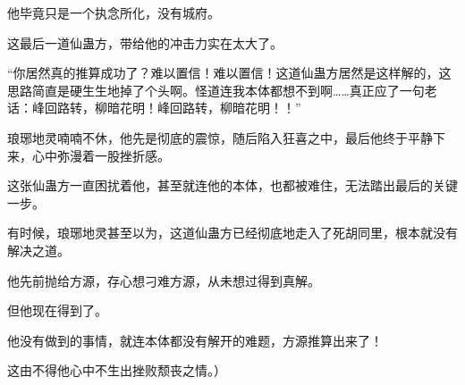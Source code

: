 \begin{this_body}
他毕竟只是一个执念所化，没有城府。

这最后一道仙蛊方，带给他的冲击力实在太大了。

“你居然真的推算成功了？难以置信！难以置信！这道仙蛊方居然是这样解的，这思路简直是硬生生地掉了个头啊。怪道连我本体都想不到啊……真正应了一句老话：峰回路转，柳暗花明！峰回路转，柳暗花明！！”

琅琊地灵喃喃不休，他先是彻底的震惊，随后陷入狂喜之中，最后他终于平静下来，心中弥漫着一股挫折感。

这张仙蛊方一直困扰着他，甚至就连他的本体，也都被难住，无法踏出最后的关键一步。

有时候，琅琊地灵甚至以为，这道仙蛊方已经彻底地走入了死胡同里，根本就没有解决之道。

他先前抛给方源，存心想刁难方源，从未想过得到真解。

但他现在得到了。

他没有做到的事情，就连本体都没有解开的难题，方源推算出来了！

这由不得他心中不生出挫败颓丧之情。）

\end{this_body}

